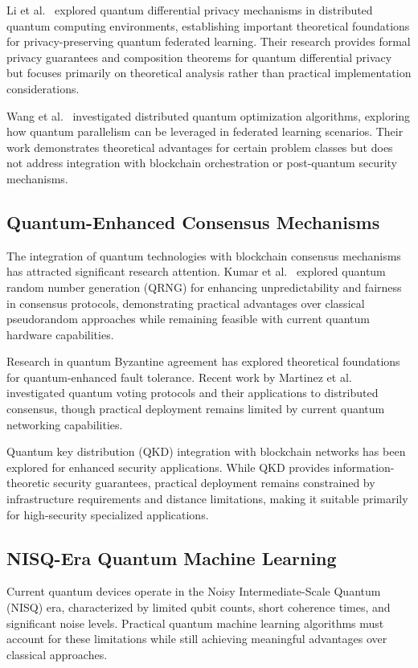\documentclass[10pt,journal,compsoc]{IEEEtran}
\begin{document}
Li et al.~\cite{Li2024} explored quantum differential privacy mechanisms in distributed quantum computing environments, establishing important theoretical foundations for privacy-preserving quantum federated learning. Their research provides formal privacy guarantees and composition theorems for quantum differential privacy but focuses primarily on theoretical analysis rather than practical implementation considerations.

Wang et al.~\cite{Wang2024} investigated distributed quantum optimization algorithms, exploring how quantum parallelism can be leveraged in federated learning scenarios. Their work demonstrates theoretical advantages for certain problem classes but does not address integration with blockchain orchestration or post-quantum security mechanisms.

\subsection{Quantum-Enhanced Consensus Mechanisms}

The integration of quantum technologies with blockchain consensus mechanisms has attracted significant research attention. Kumar et al.~\cite{Kumar2024} explored quantum random number generation (QRNG) for enhancing unpredictability and fairness in consensus protocols, demonstrating practical advantages over classical pseudorandom approaches while remaining feasible with current quantum hardware capabilities.

Research in quantum Byzantine agreement has explored theoretical foundations for quantum-enhanced fault tolerance. Recent work by Martinez et al.~\cite{Martinez2024} investigated quantum voting protocols and their applications to distributed consensus, though practical deployment remains limited by current quantum networking capabilities.

Quantum key distribution (QKD) integration with blockchain networks has been explored for enhanced security applications. While QKD provides information-theoretic security guarantees, practical deployment remains constrained by infrastructure requirements and distance limitations, making it suitable primarily for high-security specialized applications.

\subsection{NISQ-Era Quantum Machine Learning}

Current quantum devices operate in the Noisy Intermediate-Scale Quantum (NISQ) era, characterized by limited qubit counts, short coherence times, and significant noise levels. Practical quantum machine learning algorithms must account for these limitations while still achieving meaningful advantages over classical approaches.
\end{document}
